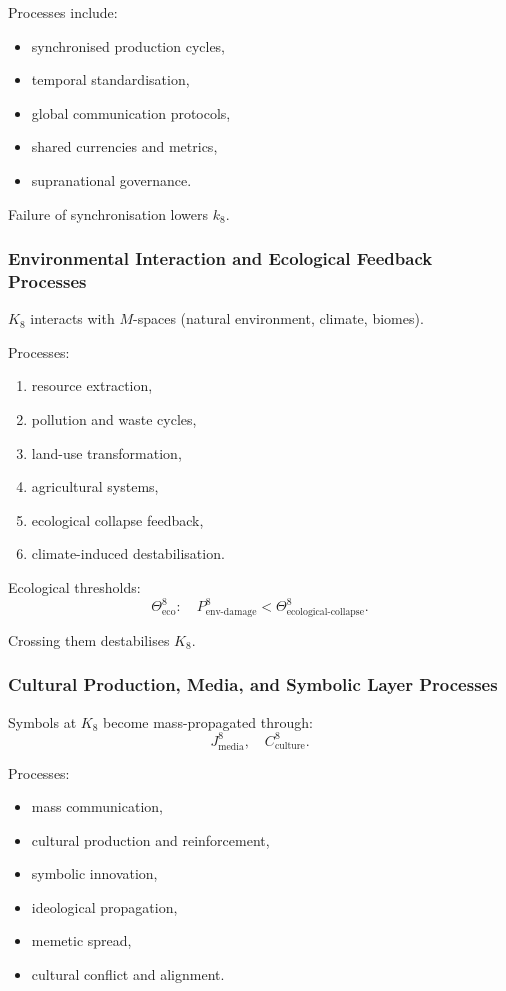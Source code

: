 Processes include:
\begin{itemize}
    \item synchronised production cycles,
    \item temporal standardisation,
    \item global communication protocols,
    \item shared currencies and metrics,
    \item supranational governance.
\end{itemize}

Failure of synchronisation lowers $k_8$.

\subsubsection{Environmental Interaction and Ecological Feedback Processes}

$K_8$ interacts with $M$-spaces (natural environment, climate, biomes).

Processes:
\begin{enumerate}
    \item resource extraction,
    \item pollution and waste cycles,
    \item land-use transformation,
    \item agricultural systems,
    \item ecological collapse feedback,
    \item climate-induced destabilisation.
\end{enumerate}

Ecological thresholds:
\[
\Theta^8_{\text{eco}}: \quad  
P^8_{\text{env-damage}} < \Theta^8_{\text{ecological-collapse}}.
\]

Crossing them destabilises $K_8$.

\subsubsection{Cultural Production, Media, and Symbolic Layer Processes}

Symbols at $K_8$ become mass-propagated through:
\[
J^8_{\text{media}},\quad 
C^8_{\text{culture}}.
\]

Processes:
\begin{itemize}
    \item mass communication,
    \item cultural production and reinforcement,
    \item symbolic innovation,
    \item ideological propagation,
    \item memetic spread,
    \item cultural conflict and alignment.
\end{itemize}

